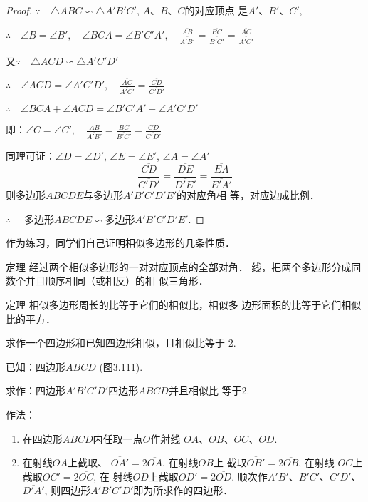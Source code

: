\begin{proof}
$\because\quad \triangle ABC\backsim \triangle A'B'C'$, $A$、$B$、$C$的对应顶点
是$A'$、$B'$、$C'$,

$\therefore\quad \angle B=\angle B',\quad \angle BCA=\angle B'C'A',\quad  \frac{\overline{AB}}{\overline{A'B'}}=\frac{\overline{BC}}{\overline{B'C'}}=\frac{\overline{AC}}{\overline{A'C'}}$

又$\because\quad \triangle ACD\backsim \triangle A'C'D'$

$\therefore\quad \angle ACD=\angle A'C'D',\quad \frac{\overline{AC}}{\overline{A'C'}}=\frac{\overline{CD}}{\overline{C'D'}}$

$\therefore\quad \angle BCA+\angle ACD=\angle B'C'A'+\angle A'C'D'$

即：$\angle C=\angle C',\quad \frac{\overline{AB}}{\overline{A'B'}}=\frac{\overline{BC}}{\overline{B'C'}}=\frac{\overline{CD}}{\overline{C'D'}}$

同理可证：$\angle D=\angle D'$, $\angle E=\angle E'$, $\angle A=\angle A'$
\[\frac{\overline{CD}}{\overline{C'D'}}=\frac{\overline{DE}}{\overline{D'E'}}=\frac{\overline{EA}}{\overline{E'A'}}\]
则多边形$ABCDE$与多边形$A'B'C'D'E'$的对应角相
等，对应边成比例．

$\therefore\quad$ 多边形$ABCDE\backsim $多边形$A'B'C'D'E'$.
\end{proof}

作为练习，同学们自己证明相似多边形的几条性质．
\begin{blk}
    {定理} 经过两个相似多边形的一对对应顶点的全部对角．
线，把两个多边形分成同数个并且顺序相同（或相反）的相
似三角形．
\end{blk}

\begin{blk}
   {定理} 相似多边形周长的比等于它们的相似比，相似多
边形面积的比等于它们相似比的平方． 
\end{blk}

\begin{example}
    求作一个四边形和已知四边形相似，且相似比等于
    2.

    已知：四边形$ABCD$ (图3.111).

    求作：四边形$A'B'C'D'$四边形$ABCD$并且相似比
等于2.

作法：
\begin{enumerate}
    \item 在四边形$ABCD$内任取一点$O$作射线
$OA$、$OB$、$OC$、$OD$.
\item 在射线$OA$上截取、
$\overline{OA'}=2\overline{OA}$, 在射线$OB$上
截取$\overline{OB'}=2\overline{OB}$, 在射线
$OC$上截取$\overline{OC'}=2\overline{OC}$, 在
射线$OD$上截取$\overline{OD'}=2\overline{OD}$. 
顺次作$\overline{A'B'}$、$\overline{B'C'}$、$\overline{C'D'}$、$\overline{D'A'}$, 
则四边形$A'B'C'D'$即为所求作的四边形．
\end{enumerate}
\end{example}

